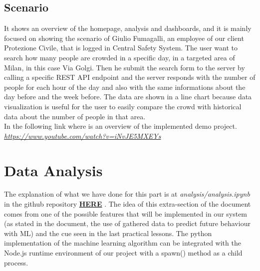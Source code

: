 \documentclass[../main.tex]{subfiles}
\begin{document}
\subsection{Scenario}
It shows an overview of the homepage, analysis and dashboards, and it is mainly focused on showing the scenario of Giulio Fumagalli, an employee of our client Protezione Civile, that is logged in Central Safety System.
The user want to search how many people are crowded in a specific day, in a targeted area of Milan, in this case Via Golgi.
Then he submit the search form to the server by calling a specific REST API endpoint and the server responds with the number of people for each hour of the day and also with the same informations about the day before and the week before.
The data are shown in a line chart because data visualization is useful for the user to easily compare the crowd with historical data about the number of people in that area.
\\
In the following link where is an overview of the implemented demo project.\\
\href{https://www.youtube.com/watch?v=iNvJE5MXEYs}{\textit{https://www.youtube.com/watch?v=iNvJE5MXEYs}}
\section{Data Analysis}
The explanation of what we have done for this part is at \textit{analysis/analysis.ipynb} in the github repository \href{https://github.com/fedy97/digital-innovation-lab-2020}{\textbf{HERE}} .
The idea of this extra-section of the document comes from one of the possible features that will be implemented in our system (as stated in the document, the use of gathered data to predict future behaviour with ML) and the cue seen in the last practical lessons. The python implementation of the machine learning algorithm can be integrated with the Node.js runtime environment of our project with a spawn() method as a child process.
\end{document}
